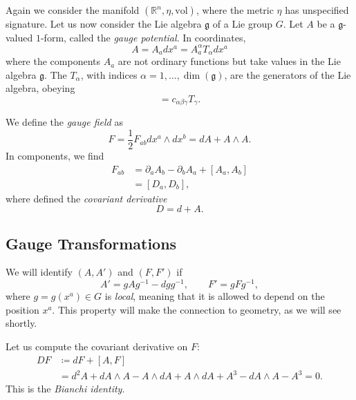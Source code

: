 Again we consider the manifold $(\mathbb{R}^n, \eta, \text{vol})$, where the metric $\eta$ has unspecified signature.
Let us now consider the Lie algebra $\mathfrak{g}$ of a Lie group $G$.
Let $A$ be a $\mathfrak{g}$-valued $1$-form, called the \emph{gauge potential}.
In coordinates,
\begin{equation}
  A = A_a dx^{a} = A_a^{\alpha} T_{\alpha} dx^{a}
\end{equation}
where the components $A_a$ are not ordinary functions but take values in the Lie algebra $\mathfrak{g}$.
The $T_{\alpha}$, with indices $\alpha = 1, \dots, \dim(\mathfrak{g})$, are the generators of the Lie algebra, obeying
\begin{equation}
  [T_{\alpha}, T_{\beta}] = c_{\alpha\beta\gamma} T_{\gamma}.
\end{equation}
\begin{definition}
  We define the \emph{gauge field} as 
  \begin{equation}
    F = \frac{1}{2} F_{ab} dx^{a} \wedge dx^{b} = \boxed{dA + A \wedge A}.
  \end{equation}
  In components, we find
  \begin{align}
    F_{ab} &= \partial_{a} A_{b} - \partial_{b} A_{a} + [A_{a}, A_{b}] \\
    &= [D_a, D_b],
  \end{align}
  where defined the \emph{covariant derivative}
  \begin{equation}
    D = d + A.
  \end{equation}
\end{definition}

\subsection{Gauge Transformations}%
\label{sub:gauge_transformations}

We will identify $(A, A')$ and $(F, F')$ if
\begin{equation}
  A' = g A g^{-1} - d g g^{-1}, \qquad F' = g F g^{-1},
\end{equation}
where $g = g(x^{a}) \in G$ is \emph{local}, meaning that it is allowed to depend on the position $x^{a}$.
This property will make the connection to geometry, as we will see shortly.

Let us compute the covariant derivative on $F$:
\begin{align}
  D F &\coloneqq d F + [A, F] \\
  &= d^2 A + dA \wedge A - A \wedge d A + A \wedge d A + A^3 - dA \wedge A - A^3 = 0.
\end{align}
This is the \emph{Bianchi identity}.

